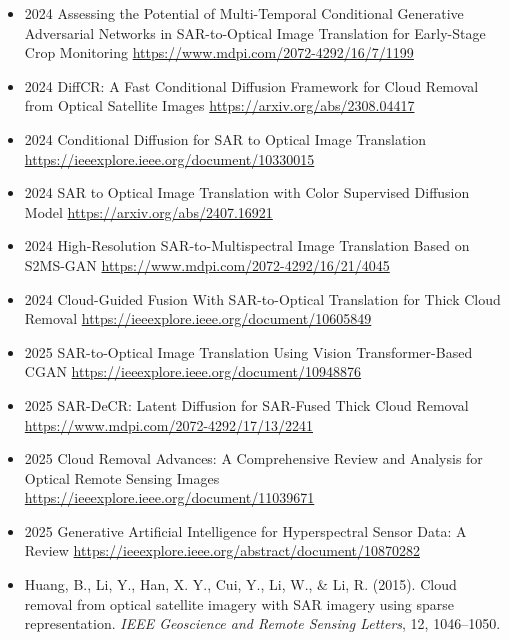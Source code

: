 \begin{itemize}
    \item 2024 Assessing the Potential of Multi-Temporal Conditional Generative Adversarial Networks in SAR-to-Optical Image Translation for Early-Stage Crop Monitoring
    \url{https://www.mdpi.com/2072-4292/16/7/1199}

    \item 2024 DiffCR: A Fast Conditional Diffusion Framework for Cloud Removal from Optical Satellite Images
    \url{https://arxiv.org/abs/2308.04417}

    \item 2024  Conditional Diffusion for SAR to Optical Image Translation
    \url{https://ieeexplore.ieee.org/document/10330015}

    \item 2024  SAR to Optical Image Translation with Color Supervised Diffusion Model
    \url{https://arxiv.org/abs/2407.16921}
    
    \item 2024  High-Resolution SAR-to-Multispectral Image Translation Based on S2MS-GAN
    \url{https://www.mdpi.com/2072-4292/16/21/4045}
    
    \item 2024  Cloud-Guided Fusion With SAR-to-Optical Translation for Thick Cloud Removal
    \url{https://ieeexplore.ieee.org/document/10605849}

    \item 2025 SAR-to-Optical Image Translation Using Vision Transformer-Based CGAN
    \url{https://ieeexplore.ieee.org/document/10948876}

    \item 2025 SAR-DeCR: Latent Diffusion for SAR-Fused Thick Cloud Removal
    \url{https://www.mdpi.com/2072-4292/17/13/2241}
    
    \item 2025 Cloud Removal Advances: A Comprehensive Review and Analysis for Optical Remote Sensing Images
    \url{https://ieeexplore.ieee.org/document/11039671}
    
    \item 2025 Generative Artificial Intelligence for Hyperspectral Sensor Data: A Review
    \url{https://ieeexplore.ieee.org/abstract/document/10870282}
    

    \item Huang, B., Li, Y., Han, X. Y., Cui, Y., Li, W., & Li, R. (2015). Cloud removal from optical satellite imagery with SAR imagery using sparse representation. \textit{IEEE Geoscience and Remote Sensing Letters}, 12, 1046–1050.


\end{itemize}
